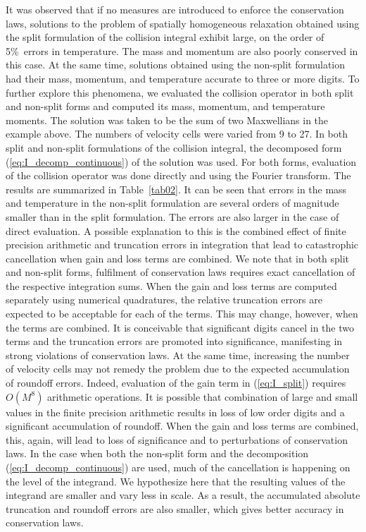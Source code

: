 \documentclass[12pt]{CSUNthesis}
\begin{document}
It was observed that if no measures are introduced to enforce the conservation laws,  
solutions to the problem of spatially homogeneous relaxation obtained using the 
split formulation of the collision integral exhibit large, on the order of 5\%\ errors in 
temperature. The mass and momentum are also poorly conserved in this case. 
At the same time, solutions obtained using the non-split formulation had their mass, momentum,
and temperature accurate to three or more digits. To further explore this phenomena, 
we evaluated the collision operator in both split and non-split forms and computed its mass, 
momentum, and temperature moments. The solution was taken to be the sum of two Maxwellians 
in the example above. The numbers of velocity cells were 
varied from 9 to 27. In both split and non-split 
formulations of the collision integral, the decomposed form (\ref{eq:I_decomp_continuous}) of the solution was 
used. For both forms, evaluation of the collision operator was done directly and using the Fourier transform. 
The results are summarized in Table~\ref{tab02}. It can be seen that errors in the mass and 
temperature in the non-split formulation are several orders of magnitude smaller than in 
the split formulation. The errors are also larger in the case of direct evaluation. 
A possible explanation to this is the combined effect of finite precision 
arithmetic and truncation errors in integration that lead to catastrophic cancellation 
when gain and loss terms are combined. 
We note that in 
both split and non-split forms, fulfilment of 
conservation laws requires exact cancellation of the respective integration 
sums. 
When the gain and
loss terms are computed separately using numerical quadratures, the 
relative truncation errors are expected to be acceptable for each of the terms. 
This may change, however, when the terms are combined. It is 
conceivable that significant digits cancel in the two terms and the 
truncation errors are promoted into significance, manifesting in strong 
violations of conservation laws. At the same time, increasing 
the number of velocity cells may not remedy the problem 
due to the expected accumulation of roundoff 
errors. Indeed, evaluation of the gain term in (\ref{eq:I_split}) requires 
$O(M^8)$ arithmetic operations. 
It is possible that combination of large and small values in the finite 
precision arithmetic results in loss of low order digits and a significant 
accumulation of roundoff. When the gain and loss terms are combined, 
this, again, will lead to loss of significance and to perturbations of 
conservation laws. In the case when both the  
non-split form and the decomposition (\ref{eq:I_decomp_continuous}) are used, 
much of the cancellation is happening 
on the level of the integrand. 
We hypothesize here 
that the resulting values of the integrand are smaller and vary less 
in scale. As a result, the accumulated absolute truncation and 
roundoff errors are also smaller, which gives better accuracy in 
conservation laws.
\end{document}
